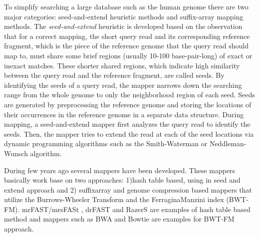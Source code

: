 To simplify searching a large database such as the human genome there are two major categories: seed-and-extend heuristic methods and suffix-array mapping methods. The \emph{seed-and-extend} heuristic is developed based on the observation that for a correct mapping, the short query read and its corresponding reference fragment, which is the piece of the reference genome that the query read should map to, must share some brief regions (usually 10-100 base-pair-long) of exact or inexact matches. These shorter shared regions, which indicate high similarity between the query read and the reference fragment, are called seeds. By identifying the seeds of a query read, the mapper narrows down the searching range from the whole genome to only the neighborhood region of each seed. Seeds are generated by preprocessing the reference genome and storing the locations of their occurrences in the reference genome in a separate data structure. During mapping, a seed-and-extend mapper first analyzes the query read to identify the seeds. Then, the mapper tries to extend the read at each of the seed locations via dynamic programming algorithms such as the Smith-Waterman \citep{smith1981identification} or Neddleman-Wunsch \citep{needleman} algorithm.

During few years ago several mappers have been developed. These mappers basically work base on two approaches: 1)hash table based, using in seed and extend approach and 2) suffixarray and genome compression based mappers that utilize the Burrows-Wheeler Transform and the FerraginaManzini index (BWT-FM).  mrFAST/mrsFASt \cite{mrfast}\cite{mrsfast}, drFAST\cite{drfast} and RazerS\cite{razers} are examples of hash table based method and mappers such as BWA\cite{bwa} and Bowtie\cite{bowtie} are examples for BWT-FM approach. 


  
  
  
  